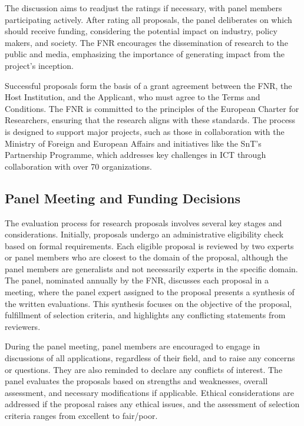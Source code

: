 \documentclass[12pt]{article}
\begin{document}
The discussion aims to readjust the ratings if necessary, with panel members participating actively. After rating all proposals, the panel deliberates on which should receive funding, considering the potential impact on industry, policy makers, and society. The FNR encourages the dissemination of research to the public and media, emphasizing the importance of generating impact from the project's inception.

Successful proposals form the basis of a grant agreement between the FNR, the Host Institution, and the Applicant, who must agree to the Terms and Conditions. The FNR is committed to the principles of the European Charter for Researchers, ensuring that the research aligns with these standards. The process is designed to support major projects, such as those in collaboration with the Ministry of Foreign and European Affairs and initiatives like the SnT’s Partnership Programme, which addresses key challenges in ICT through collaboration with over 70 organizations.

\subsection{Panel Meeting and Funding Decisions}

The evaluation process for research proposals involves several key stages and considerations. Initially, proposals undergo an administrative eligibility check based on formal requirements. Each eligible proposal is reviewed by two experts or panel members who are closest to the domain of the proposal, although the panel members are generalists and not necessarily experts in the specific domain. The panel, nominated annually by the FNR, discusses each proposal in a meeting, where the panel expert assigned to the proposal presents a synthesis of the written evaluations. This synthesis focuses on the objective of the proposal, fulfillment of selection criteria, and highlights any conflicting statements from reviewers.

During the panel meeting, panel members are encouraged to engage in discussions of all applications, regardless of their field, and to raise any concerns or questions. They are also reminded to declare any conflicts of interest. The panel evaluates the proposals based on strengths and weaknesses, overall assessment, and necessary modifications if applicable. Ethical considerations are addressed if the proposal raises any ethical issues, and the assessment of selection criteria ranges from excellent to fair/poor.
\end{document}
